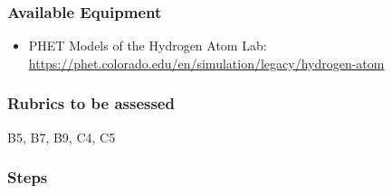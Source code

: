\subsubsection{Available Equipment}

\begin{itemize}
	\item PHET Models of the Hydrogen Atom Lab: \url{https://phet.colorado.edu/en/simulation/legacy/hydrogen-atom}
\end{itemize}

\subsubsection{Rubrics to be assessed}

B5, B7, B9, C4, C5

\subsubsection{Steps}


